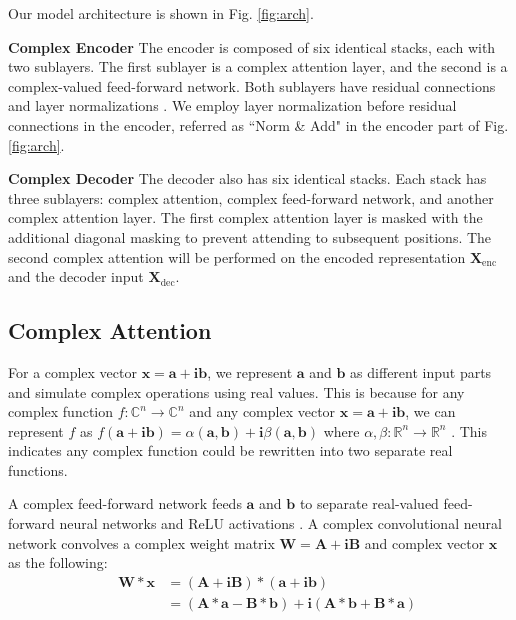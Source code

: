 \documentclass{article}
\def\vx{{\mathbf x}}
\def\va{{\mathbf a}}
\def\vb{{\mathbf b}}
\def\vi{{\mathbf i}}
\def\mX{{\mathbf X}}
\def\mA{{\mathbf A}}
\def\mB{{\mathbf B}}
\def\mW{{\mathbf W}}
\begin{document}
Our model architecture is shown in Fig. \ref{fig:arch}. 

\textbf{Complex Encoder} The encoder is composed of six identical stacks, each with two sublayers. The first sublayer is a complex attention layer, and the second is a complex-valued feed-forward network. Both sublayers have residual connections \cite{he2016deep} and layer normalizations \cite{ba2016layer}. We employ layer normalization before residual connections in the encoder, referred as ``Norm \& Add" in the encoder part of Fig. \ref{fig:arch}.

\textbf{Complex Decoder} The decoder also has six identical stacks. Each stack has three sublayers: complex attention, complex feed-forward network, and another complex attention layer. The first complex attention layer is masked with the additional diagonal masking to prevent attending to subsequent positions. The second complex attention will be performed on the encoded representation $\mX_{\text{enc}}$ and the decoder input $\mX_{\text{dec}}$. 

\subsection{Complex Attention}

For a complex vector $\vx = \va + \vi\vb$, we represent $\va$ and $\vb$ as different input parts and simulate complex operations using real values. This is because for any complex function $f : \mathbb{C}^n \rightarrow \mathbb{C}^n $ and any complex vector $\vx = \va + \vi\vb$, we can represent $f$ as $f(\va + \vi\vb) = \alpha(\va, \vb) + \vi\beta(\va, \vb)$ where $\alpha, \beta : \mathbb{R}^n \rightarrow \mathbb{R}^n $  \cite{arjovsky2016unitary}. This indicates any complex function could be rewritten into two separate real functions.

A complex feed-forward network feeds $\va$ and $\vb$ to separate real-valued feed-forward neural networks and ReLU activations \cite{trabelsi2017deep}. A complex convolutional neural network \cite{trabelsi2017deep} convolves a complex weight matrix $\mW = \mA + \vi \mB$ and complex vector $\vx$ as the following:
\begin{equation}
\label{eq:equation}
\begin{split}
\ \ \ \ \ \mW * \vx & = (\mA + \vi \mB) * (\va + \vi \vb) \\
& = (\mA * \va - \mB * \vb) + \vi (\mA * \vb + \mB * \va)
\end{split}
\end{equation}
\end{document}
